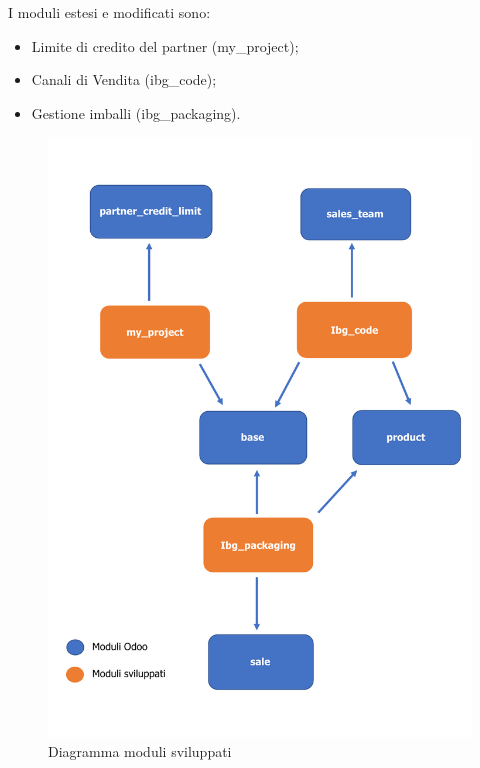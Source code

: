 I moduli estesi e modificati sono: \begin{itemize}
	\item Limite di credito del partner (my\_project);
	\item Canali di Vendita (ibg\_code);
	\item Gestione imballi (ibg\_packaging).
\end{itemize}
\begin{figure}[H]
	\begin{center} \includegraphics[scale=0.50]{figures/diagramma}
		\caption[Diagramma moduli sviluppati]{Diagramma moduli sviluppati}
		\label{fig:diagramma}
	\end{center}
\end{figure}
\newpage
